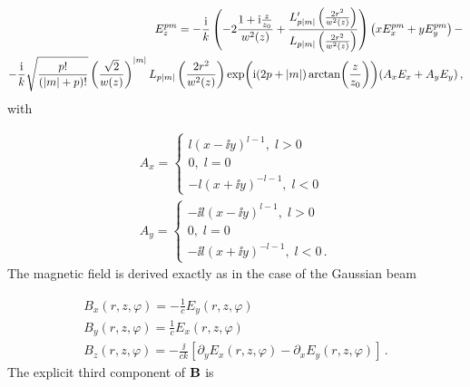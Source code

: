 \documentclass[12pt, class=report, crop=false]{standalone}
\begin{document}
\begin{equation}
  \begin{aligned}
    E_z^{pm} = - \frac{\mathrm{i}}{k} \left(-2\frac{1+\mathrm{i}\frac{z}{z_0}}{w^2(z)} +\frac{L_{p\abs{m}}'\left(\frac{2r^2}{w^2(z)}\right)}{L_{p\abs{m}}\left(\frac{2r^2}{w^2(z)}\right)}\right) \left( xE_x^{pm} + yE_y^{pm} \right) - \\
    -\frac{\mathrm{i}}{k}\sqrt{\frac{p!}{(\abs{m}+p)!}} \left(\frac{\sqrt{2}}{w(z)}\right)^{\abs{m}} L_{p\abs{m}} \left(\frac{2r^2}{w^2(z)}\right) \exp(\mathrm{i} (2p+\abs{m}) \arctan(\frac{z}{z_0})) (A_x E_x + A_y E_y)\,,
  \end{aligned}
\end{equation}
with

\begin{subequations}
  \begin{align}
    A_x =
    \begin{cases}
      l (x - \ii y)^{l-1} , \; l>0 \\
      0,\;l=0\\
      -l(x+\ii y)^{-l-1},\; l<0
    \end{cases} \\
    A_y =
    \begin{cases}
      -\ii l (x - \ii y)^{l-1} , \; l>0 \\
      0,\;l=0\\
      -\ii l(x+\ii y)^{-l-1},\; l<0\,.
    \end{cases}
  \end{align}
\end{subequations}
The magnetic field is derived exactly as in the case of the Gaussian beam

\begin{subequations}
  \begin{align}
    B_x(r,z,\varphi) = -\frac{1}{c}E_y(r,z,\varphi)\\
    B_y(r,z,\varphi) = \frac{1}{c}E_x(r,z,\varphi)\\
    B_z (r,z,\varphi) = -\frac{\ii}{ck} \left[ \partial_y E_x (r,z,\varphi) - \partial_x E_y (r,z,\varphi) \right] \,.
  \end{align}
\end{subequations}
The explicit third component of \(\vb{B}\) is
\end{document}
